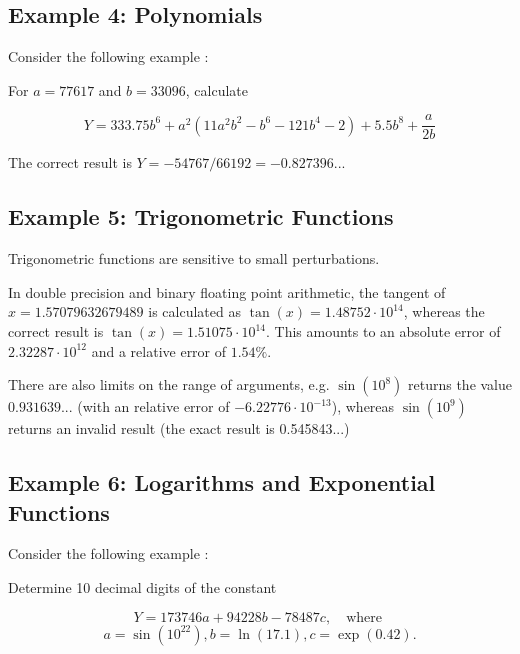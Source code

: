 \subsection{Example 4: Polynomials}

Consider the following example \cite{Cuyt_2001}: 

\vpara
For $a=77617$ and $b=33096$, calculate

\begin{equation}
Y = 333.75 b^6 + a^2  (11 a^2  b^2 - b^6 - 121 b^4 - 2) + 5.5  b^8 + \frac{a}{2b} 
\end{equation}

The correct result is $Y = -54767 / 66192 = -0.827396...$




\subsection{Example 5: Trigonometric Functions}

Trigonometric functions are sensitive to small perturbations. 

\vpara
In double precision and binary floating point arithmetic, the tangent of $x = 1.57079632679489$ is calculated as $\tan(x) = 1.48752 \cdot 10^{14}$, whereas the correct result is $\tan(x) = 1.51075 \cdot 10^{14}$. This amounts to an absolute error of $2.32287  \cdot 10^{12}$ and a relative error of $1.54\%$.

\vpara
There are also limits on the range of arguments, e.g. $\sin(10^{8})$ returns the value $0.931639...$ (with an relative error of $-6.22776 \cdot 10^{-13}$), whereas  $\sin(10^{9})$ returns an invalid result (the exact result is 0.545843...)





\subsection{Example 6: Logarithms and Exponential Functions}


Consider the following example \citep{Ghazi2010} : 

Determine 10 decimal digits of the constant

\begin{equation}
Y = 173746a + 94228b - 78487c, \quad \text{where } 
\end{equation}
\begin{equation}
a = \sin(10^{22}), b = \ln(17.1), c = \exp(0.42). 
\end{equation}

